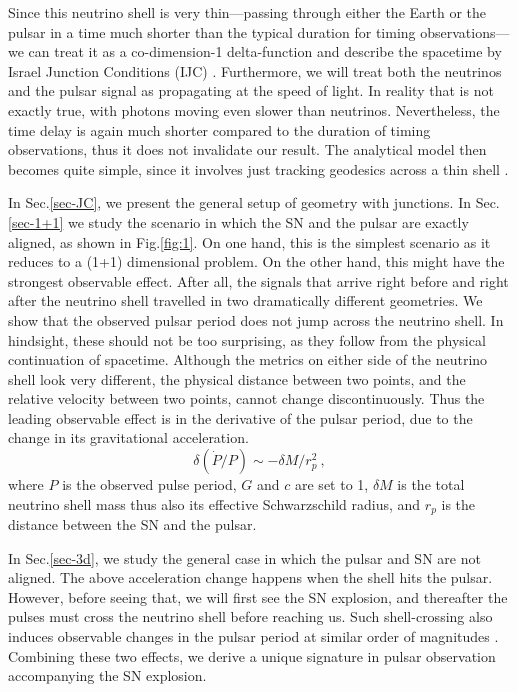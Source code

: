 \documentclass[aps,showpacs,onecolumn,floats,prd,superscriptaddress,nofootinbib]{revtex4}
\begin{document}
Since this neutrino shell is very thin---passing through either the Earth or the pulsar in a time much shorter than the typical duration for timing observations---we can treat it as a co-dimension-1 delta-function and describe the spacetime by Israel Junction Conditions (IJC) \cite{Isr66}. Furthermore, we will treat both the neutrinos and the pulsar signal as propagating at the speed of light. In reality that is not exactly true, with photons moving even slower than neutrinos. Nevertheless, the time delay is again much shorter compared to the duration of timing observations, thus it does not invalidate our result. The analytical model then becomes quite simple, since it involves just tracking geodesics across a thin shell \cite{BouFre07,JohYan10,OluPie13}.

In Sec.\ref{sec-JC}, we present the general setup of geometry with junctions. In Sec.\ref{sec-1+1} we study the scenario in which the SN and the pulsar are exactly aligned, as shown in Fig.\ref{fig:1}. On one hand, this is the simplest scenario as it reduces to a (1+1) dimensional problem. On the other hand, this might have the strongest observable effect. After all, the signals that arrive right before and right after the neutrino shell travelled in two dramatically different geometries. We show that the observed pulsar period does not jump across the neutrino shell. In hindsight, these should not be too surprising, as they follow from the physical continuation of spacetime. Although the metrics on either side of the neutrino shell look very different, the physical distance between two points, and the relative velocity between two points, cannot change discontinuously. %
Thus the leading observable effect is in the derivative of the pulsar period, due to the change in its gravitational acceleration. 
\begin{equation}
\delta(\dot{P}/P) \sim -\delta M / r_p^2~,
\label{eq-main}
\end{equation}
where $P$ is the observed pulse period, $G$ and $c$ are set to 1, $\delta M$ is the total neutrino shell mass thus also its effective Schwarzschild radius, and $r_p$ is the distance between the SN and the pulsar. 

In Sec.\ref{sec-3d}, we study the general case in which the pulsar and SN are not aligned. The above acceleration change happens when the shell hits the pulsar. However, before seeing that, we will first see the SN explosion, and thereafter the pulses must cross the neutrino shell before reaching us. Such shell-crossing also induces observable changes in the pulsar period at similar order of magnitudes \cite{OluPie13}. Combining these two effects, we derive a unique signature in pulsar observation accompanying the SN explosion.
\end{document}
